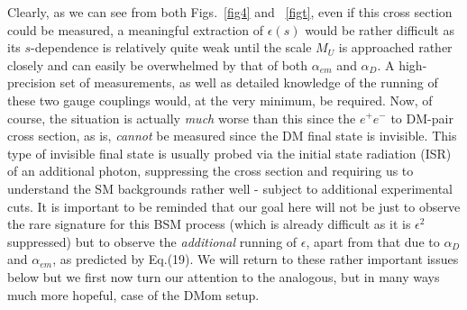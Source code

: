 \documentclass[14pt]{article}
\begin{document}
{Clearly, as we can see from both Figs.~\ref{fig4} and ~\ref{figt}, even if this cross section could be measured, a meaningful extraction of $\epsilon(s)$ would be rather difficult as its 
$s$-dependence is relatively quite weak until the scale $M_U$ is approached rather closely and can easily be overwhelmed by that of both $\alpha_{em}$ and $\alpha_D$. A high-precision 
set of measurements, as well as detailed knowledge of the running of these two gauge couplings would, at the very minimum, be required. Now, of course, the situation is actually {\it much} 
worse than this since the $e^+e^-$ to DM-pair cross section, as is, {\it cannot} be measured since the DM final state is invisible. This type of invisible final state is usually probed via the initial state radiation 
(ISR) of an additional photon, suppressing the cross section and requiring us to understand the SM backgrounds rather well - subject to additional experimental cuts. It is important to be reminded that 
our goal here will not be just to observe the rare signature for this BSM process (which is already difficult as it is $\epsilon^2$ suppressed) but to observe the {\it additional} running of $\epsilon$, apart 
from that due to $\alpha_D$ and $\alpha_{em}$,  as predicted 
by Eq.(19). We will return to these rather important issues below but we first now turn our attention to the analogous, but in many ways much more hopeful, case of the DMom setup.

}
\end{document}
